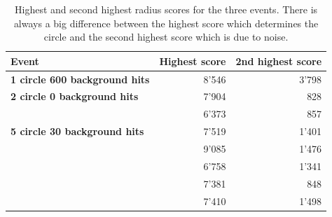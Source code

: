 \documentclass[11pt]{scrreprt}
\begin{document}
\begin{table}[tbp]
  \caption[1D Radius scores for the different events]{Highest and second highest radius scores for the three events. There is always a big difference between the highest score
  which determines the circle and the second highest score which is due to noise.}
  \label{tab:1d_scores}
  \centering

  \begin{tabular}{lrr}
  \toprule




  \midrule
  \textbf{Event} & \textbf{Highest score} & \textbf{2nd highest score} \\
  \midrule
  \textbf{1 circle 600 background hits} & 8'546 & 3'798\\
  \midrule
  \textbf{2 circle 0 background hits} & 7'904 & 828\\
   & 6'373 & 857\\
  \midrule
  \textbf{5 circle 30 background hits} & 7'519 & 1'401\\
  & 9'085 & 1'476\\
  & 6'758 & 1'341\\
  & 7'381 & 848\\
  & 7'410 & 1'498\\
  \bottomrule
  \end{tabular}
\end{table}
\end{document}
